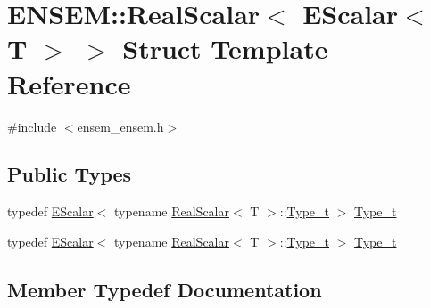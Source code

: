 \hypertarget{structENSEM_1_1RealScalar_3_01EScalar_3_01T_01_4_01_4}{}\section{E\+N\+S\+EM\+:\+:Real\+Scalar$<$ E\+Scalar$<$ T $>$ $>$ Struct Template Reference}
\label{structENSEM_1_1RealScalar_3_01EScalar_3_01T_01_4_01_4}


{\ttfamily \#include $<$ensem\+\_\+ensem.\+h$>$}

\subsection*{Public Types}
\begin{DoxyCompactItemize}
\item 
typedef \mbox{\hyperlink{classENSEM_1_1EScalar}{E\+Scalar}}$<$ typename \mbox{\hyperlink{structENSEM_1_1RealScalar}{Real\+Scalar}}$<$ T $>$\+::\mbox{\hyperlink{structENSEM_1_1RealScalar_3_01EScalar_3_01T_01_4_01_4_a5aaad1821350deadcff050085f21ff07}{Type\+\_\+t}} $>$ \mbox{\hyperlink{structENSEM_1_1RealScalar_3_01EScalar_3_01T_01_4_01_4_a5aaad1821350deadcff050085f21ff07}{Type\+\_\+t}}
\item 
typedef \mbox{\hyperlink{classENSEM_1_1EScalar}{E\+Scalar}}$<$ typename \mbox{\hyperlink{structENSEM_1_1RealScalar}{Real\+Scalar}}$<$ T $>$\+::\mbox{\hyperlink{structENSEM_1_1RealScalar_3_01EScalar_3_01T_01_4_01_4_a5aaad1821350deadcff050085f21ff07}{Type\+\_\+t}} $>$ \mbox{\hyperlink{structENSEM_1_1RealScalar_3_01EScalar_3_01T_01_4_01_4_a5aaad1821350deadcff050085f21ff07}{Type\+\_\+t}}
\end{DoxyCompactItemize}


\subsection{Member Typedef Documentation}
\mbox{\label{structENSEM_1_1RealScalar_3_01EScalar_3_01T_01_4_01_4_a5aaad1821350deadcff050085f21ff07}} 
